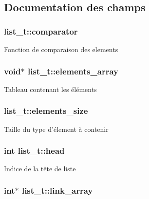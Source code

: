 \subsection{Documentation des champs}
\hypertarget{structlist__t_a37b34fd423a00ddc7ad662c29fbd177e}{
\subsubsection[{comparator}]{ list\+\_\+t\+::comparator}}\label{structlist__t_a37b34fd423a00ddc7ad662c29fbd177e}
Fonction de comparaison des elements \hypertarget{structlist__t_a799d9396ef609198dc4dff6456a99bb9}{
\subsubsection[{elements\+\_\+array}]{\setlength{\rightskip}{0pt plus 5cm}void$\ast$ list\+\_\+t\+::elements\+\_\+array}}\label{structlist__t_a799d9396ef609198dc4dff6456a99bb9}
Tableau contenant les éléments \hypertarget{structlist__t_a467978ad64ca202b560905f80a93bf8a}{
\subsubsection[{elements\+\_\+size}]{ list\+\_\+t\+::elements\+\_\+size}}\label{structlist__t_a467978ad64ca202b560905f80a93bf8a}
Taille du type d'élement à contenir \hypertarget{structlist__t_a0c48694d3aca4dbf169881b9df794cb6}{
\subsubsection[{head}]{\setlength{\rightskip}{0pt plus 5cm}int list\+\_\+t\+::head}}\label{structlist__t_a0c48694d3aca4dbf169881b9df794cb6}
Indice de la tête de liste \hypertarget{structlist__t_ae66525dffaeeeda67bd46d8c90fa2863}{
\subsubsection[{link\+\_\+array}]{\setlength{\rightskip}{0pt plus 5cm}int$\ast$ list\+\_\+t\+::link\+\_\+array}}\label{structlist__t_ae66525dffaeeeda67bd46d8c90fa2863}

